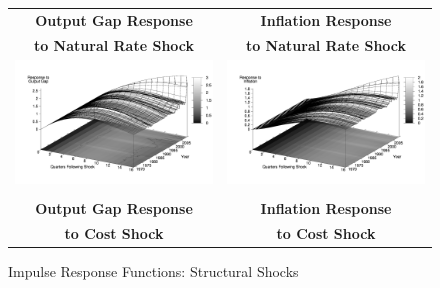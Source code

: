 \documentclass[12pt]{article}
\begin{document}
{\begin{figure}\caption{Impulse Response Functions: Structural Shocks}\label{fg:irf_structural}
\hspace*{-4pc}
\begin{tabular}{cc}\\
\textbf{Output Gap Response} & \textbf{Inflation Response} \\
\textbf{to Natural Rate Shock} & \textbf{to Natural Rate Shock}  \\
\includegraphics[scale=0.12]{images/Irf16_Output_Gap_Natural_Rate_Shock.png} & \includegraphics[scale=0.12]{images/Irf16_Inflation_Natural_Rate_Shock.png} \\\\
\textbf{Output Gap Response} & \textbf{Inflation Response} \\
\textbf{to Cost Shock} & \textbf{to Cost Shock}  \\

\end{tabular}
\end{figure}}
\end{document}
